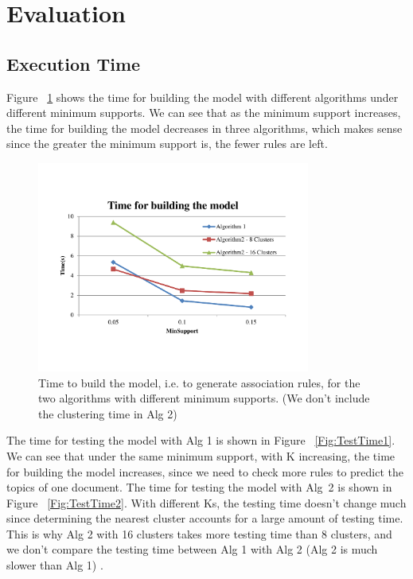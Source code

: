 \section{Evaluation}

\subsection{Execution Time}
Figure ~\ref{Fig:buildmodel} shows the time for building the model with
different algorithms under different minimum supports. We can see that as the
minimum support increases, the time for building the model decreases in
three algorithms, which makes sense since the greater the minimum support is,
the fewer rules are left.

\begin{figure}
\centering
\includegraphics[width=0.8\textwidth]{buildmodel}
\caption{\footnotesize Time to build the model, i.e. to generate association
rules, for the two algorithms with different minimum supports. (We don't include the clustering time in Alg 2)}
\label{Fig:buildmodel}
\end{figure}

The time for testing the model with Alg 1 is shown in Figure
~\ref{Fig:TestTime1}. We can see that under the same minimum support, with K
increasing, the time for building the model increases, since we need to check
more rules to predict the topics of one document. The time for testing the model
with Alg~2 is shown in Figure ~\ref{Fig:TestTime2}. With different Ks, the
testing time doesn't change much since determining the nearest cluster
accounts for a large amount of testing time. This is why Alg 2 with 16 clusters
takes more testing time than 8 clusters, and we don't compare the testing time
between Alg 1 with Alg 2 (Alg 2 is much slower than Alg 1) . 

